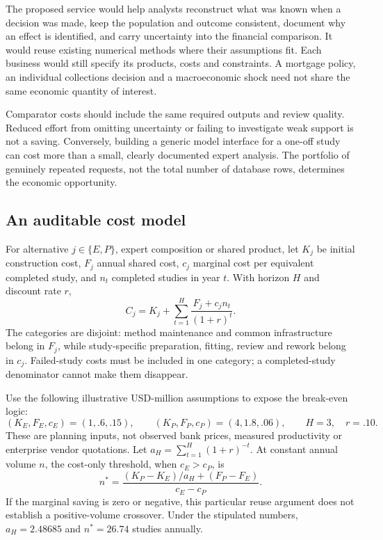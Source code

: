 The proposed service would help analysts reconstruct what was known when
a decision was made, keep the population and outcome consistent, document
why an effect is identified, and carry uncertainty into the financial
comparison. It would reuse existing numerical methods where their
assumptions fit. Each business would still specify its products, costs and
constraints. A mortgage policy, an individual collections decision and a
macroeconomic shock need not share the same economic quantity of interest.

Comparator costs should include the same required outputs and review
quality. Reduced effort from omitting uncertainty or failing to investigate
weak support is not a saving. Conversely, building a generic model interface
for a one-off study can cost more than a small, clearly documented expert
analysis. The portfolio of genuinely repeated requests, not the total
number of database rows, determines the economic opportunity.

\subsection{An auditable cost model}
\label{r3:cost-model}

For alternative $j\in\{E,P\}$, expert composition or shared product,
let $K_j$ be initial construction cost, $F_j$ annual shared cost,
$c_j$ marginal cost per equivalent completed study, and $n_t$ completed
studies in year $t$. With horizon $H$ and discount rate $r$,
\begin{equation}
 C_j=K_j+\sum_{t=1}^{H}\frac{F_j+c_jn_t}{(1+r)^t}.
 \label{r3:present-cost}
\end{equation}
The categories are disjoint: method maintenance and common infrastructure
belong in $F_j$, while study-specific preparation, fitting, review and
rework belong in $c_j$. Failed-study costs must be included in one
category; a completed-study denominator cannot make them disappear.

Use the following illustrative USD-million assumptions to expose the
break-even logic:
\[
 (K_E,F_E,c_E)=(1,.6,.15),\qquad
 (K_P,F_P,c_P)=(4,1.8,.06),\qquad H=3,\quad r=.10.
\]
These are planning inputs, not observed bank prices, measured productivity
or enterprise vendor quotations. Let
$a_H=\sum_{t=1}^H(1+r)^{-t}$. At constant annual volume $n$, the cost-only
threshold, when $c_E>c_P$, is
\begin{equation}
 n^*=\frac{(K_P-K_E)/a_H+(F_P-F_E)}{c_E-c_P}.
 \label{r3:reuse-threshold}
\end{equation}
If the marginal saving is zero or negative, this particular reuse argument
does not establish a positive-volume crossover. Under the stipulated
numbers, $a_H=2.48685$ and $n^*=26.74$ studies annually.


